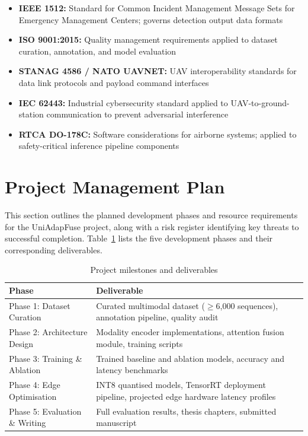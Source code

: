 \begin{itemize}
    \item \textbf{IEEE 1512:} Standard for Common Incident Management Message Sets for Emergency Management Centers; governs detection output data formats
    \item \textbf{ISO 9001:2015:} Quality management requirements applied to dataset curation, annotation, and model evaluation
    \item \textbf{STANAG 4586 / NATO UAVNET:} UAV interoperability standards for data link protocols and payload command interfaces
    \item \textbf{IEC 62443:} Industrial cybersecurity standard applied to UAV-to-ground-station communication to prevent adversarial interference
    \item \textbf{RTCA DO-178C:} Software considerations for airborne systems; applied to safety-critical inference pipeline components
\end{itemize}

\section{Project Management Plan}

This section outlines the planned development phases and resource requirements for the UniAdapFuse project, along with a risk register identifying key threats to successful completion. Table~\ref{tab:project_schedule} lists the five development phases and their corresponding deliverables.

\begin{table}[H]
\centering
\caption{Project milestones and deliverables}
\label{tab:project_schedule}
\begin{tabular}{@{}lp{8cm}@{}}
\toprule
\textbf{Phase} & \textbf{Deliverable} \\
\midrule
Phase 1: Dataset Curation      & Curated multimodal dataset ($\geq$6,000 sequences), annotation pipeline, quality audit \\
Phase 2: Architecture Design   & Modality encoder implementations, attention fusion module, training scripts \\
Phase 3: Training \& Ablation  & Trained baseline and ablation models, accuracy and latency benchmarks \\
Phase 4: Edge Optimisation     & INT8 quantised models, TensorRT deployment pipeline, projected edge hardware latency profiles \\
Phase 5: Evaluation \& Writing & Full evaluation results, thesis chapters, submitted manuscript \\
\bottomrule
\end{tabular}
\end{table}


